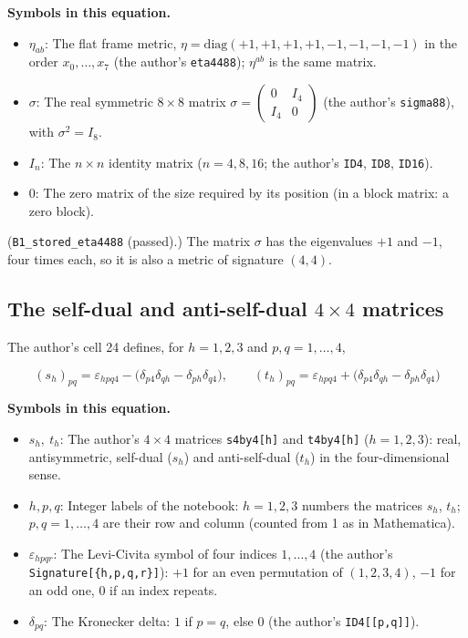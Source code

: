 \documentclass[
  10pt,
]{article}
\providecommand{\tightlist}{%
  \setlength{\itemsep}{0pt}\setlength{\parskip}{0pt}}
\begin{document}
\textbf{Symbols in this equation.}

\begin{itemize}
\tightlist
\item
  \(\eta_{ab}\): The flat frame metric,
  \(\eta = \mathrm{diag}(+1, +1, +1, +1, -1, -1, -1, -1)\) in the order
  \(x_0, \dots, x_7\) (the author's \texttt{eta4488}); \(\eta^{ab}\) is
  the same matrix.
\item
  \(\sigma\): The real symmetric \(8 \times 8\) matrix
  \(\sigma = \begin{pmatrix} 0 & I_4 \\ I_4 & 0 \end{pmatrix}\) (the
  author's \texttt{sigma88}), with \(\sigma^2 = I_8\).
\item
  \(I_n\): The \(n \times n\) identity matrix (\(n = 4, 8, 16\); the
  author's \texttt{ID4}, \texttt{ID8}, \texttt{ID16}).
\item
  \(0\): The zero matrix of the size required by its position (in a
  block matrix: a zero block).
\end{itemize}

(\texttt{B1\_stored\_eta4488} (passed).) The matrix \(\sigma\) has the
eigenvalues \(+1\) and \(-1\), four times each, so it is also a metric
of signature \((4,4)\).

\hypertarget{the-self-dual-and-anti-self-dual-4-times-4-matrices}{%
\subsection{\texorpdfstring{The self-dual and anti-self-dual
\(4 \times 4\)
matrices}{The self-dual and anti-self-dual 4 \textbackslash times 4 matrices}}\label{the-self-dual-and-anti-self-dual-4-times-4-matrices}}

The author's cell 24 defines, for \(h = 1, 2, 3\) and
\(p, q = 1, \dots, 4\),

\[
(s_h)_{pq} = \varepsilon_{hpq4} - \big(\delta_{p4}\delta_{qh} - \delta_{ph}\delta_{q4}\big),\qquad (t_h)_{pq} = \varepsilon_{hpq4} + \big(\delta_{p4}\delta_{qh} - \delta_{ph}\delta_{q4}\big)
\]

\textbf{Symbols in this equation.}

\begin{itemize}
\tightlist
\item
  \(s_h,\ t_h\): The author's \(4 \times 4\) matrices
  \texttt{s4by4{[}h{]}} and \texttt{t4by4{[}h{]}} (\(h = 1, 2, 3\)):
  real, antisymmetric, self-dual (\(s_h\)) and anti-self-dual (\(t_h\))
  in the four-dimensional sense.
\item
  \(h, p, q\): Integer labels of the notebook: \(h = 1, 2, 3\) numbers
  the matrices \(s_h\), \(t_h\); \(p, q = 1, \dots, 4\) are their row
  and column (counted from 1 as in Mathematica).
\item
  \(\varepsilon_{hpqr}\): The Levi-Civita symbol of four indices
  \(1, \dots, 4\) (the author's \texttt{Signature{[}\{h,p,q,r\}{]}}):
  \(+1\) for an even permutation of \((1, 2, 3, 4)\), \(-1\) for an odd
  one, \(0\) if an index repeats.
\item
  \(\delta_{pq}\): The Kronecker delta: \(1\) if \(p = q\), else \(0\)
  (the author's \texttt{ID4{[}{[}p,q{]}{]}}).
\end{itemize}
\end{document}
